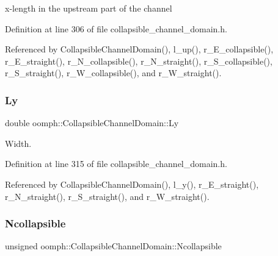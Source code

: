 x-\/length in the upstream part of the channel 



Definition at line 306 of file collapsible\+\_\+channel\+\_\+domain.\+h.



Referenced by Collapsible\+Channel\+Domain(), l\+\_\+up(), r\+\_\+\+E\+\_\+collapsible(), r\+\_\+\+E\+\_\+straight(), r\+\_\+\+N\+\_\+collapsible(), r\+\_\+\+N\+\_\+straight(), r\+\_\+\+S\+\_\+collapsible(), r\+\_\+\+S\+\_\+straight(), r\+\_\+\+W\+\_\+collapsible(), and r\+\_\+\+W\+\_\+straight().

\mbox{\label{classoomph_1_1CollapsibleChannelDomain_ac70912e194ac3e211cc0ce625c8f5c41}} 
\subsubsection{\texorpdfstring{Ly}{Ly}}
{\footnotesize\ttfamily double oomph\+::\+Collapsible\+Channel\+Domain\+::\+Ly\hspace{0.3cm}{\ttfamily [private]}}



Width. 



Definition at line 315 of file collapsible\+\_\+channel\+\_\+domain.\+h.



Referenced by Collapsible\+Channel\+Domain(), l\+\_\+y(), r\+\_\+\+E\+\_\+straight(), r\+\_\+\+N\+\_\+straight(), r\+\_\+\+S\+\_\+straight(), and r\+\_\+\+W\+\_\+straight().

\mbox{\label{classoomph_1_1CollapsibleChannelDomain_a607c389c3f0c06f0240d97aaca65cdf7}} 
\subsubsection{\texorpdfstring{Ncollapsible}{Ncollapsible}}
{\footnotesize\ttfamily unsigned oomph\+::\+Collapsible\+Channel\+Domain\+::\+Ncollapsible\hspace{0.3cm}{\ttfamily [private]}}



